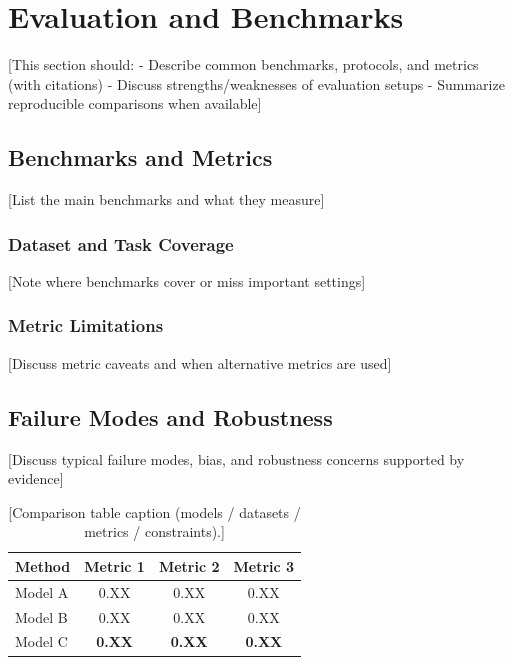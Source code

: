 \documentclass[conference]{IEEEtran}
\begin{document}
\section{Evaluation and Benchmarks}
[This section should:
- Describe common benchmarks, protocols, and metrics (with citations)
- Discuss strengths/weaknesses of evaluation setups
- Summarize reproducible comparisons when available]

\subsection{Benchmarks and Metrics}
[List the main benchmarks and what they measure]

\subsubsection{Dataset and Task Coverage}
[Note where benchmarks cover or miss important settings]

\subsubsection{Metric Limitations}
[Discuss metric caveats and when alternative metrics are used]

\subsection{Failure Modes and Robustness}
[Discuss typical failure modes, bias, and robustness concerns supported by evidence]

\begin{table}[t]
\centering
\caption{[Comparison table caption (models / datasets / metrics / constraints).]}
\label{tab:results}
\begin{tabular}{lccc}
\toprule
\textbf{Method} & \textbf{Metric 1} & \textbf{Metric 2} & \textbf{Metric 3} \\
\midrule
Model A \cite{author2023paper} & 0.XX & 0.XX & 0.XX \\
Model B \cite{jones2023transformer} & 0.XX & 0.XX & 0.XX \\
Model C \cite{zhang2024large} & \textbf{0.XX} & \textbf{0.XX} & \textbf{0.XX} \\
\bottomrule
\end{tabular}
\end{table}
\end{document}
